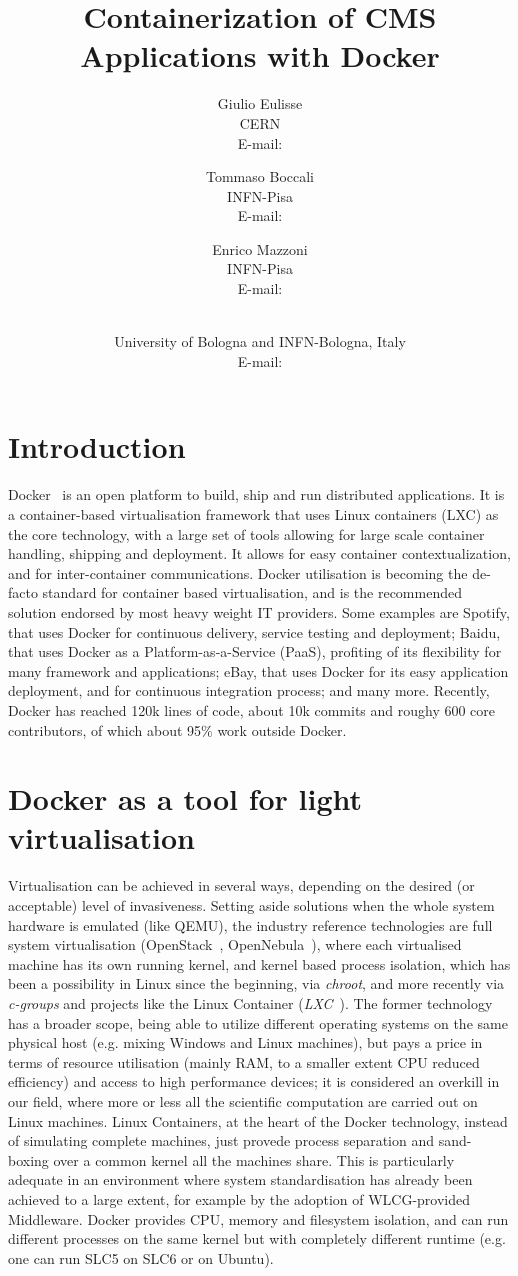 \documentclass{PoS}
\title{Containerization of CMS Applications with Docker}
\author{Giulio Eulisse\\
        CERN\\
        E-mail: \email{Giulio.Eulisse@cern.ch}}
\author{Tommaso Boccali\\
        INFN-Pisa\\
        E-mail: \email{Tommaso.Boccali@pi.infn.it}}
\author{Enrico Mazzoni\\
        INFN-Pisa\\
        E-mail: \email{enrico.mazzoni@pi.infn.it}}
\author{\speaker{Daniele Bonacorsi}\\
        University of Bologna and INFN-Bologna, Italy\\
        E-mail: \email{daniele.bonacorsi@unibo.it}}
\begin{document}
\section{Introduction}

Docker~\cite{docker} is an open platform to build, ship and run distributed applications. It is a container-based virtualisation framework that uses Linux containers (LXC) as the core technology, with a large set of tools allowing for large scale container handling, shipping and deployment. It allows for easy container contextualization, and for inter-container communications. Docker utilisation is becoming the de-facto standard for container based virtualisation, and is the recommended solution endorsed by most heavy weight IT providers. Some examples are Spotify, that uses Docker for continuous delivery, service testing and deployment; Baidu, that uses Docker as a Platform-as-a-Service (PaaS), profiting of its flexibility for many framework and applications; eBay, that uses Docker for its easy application deployment, and for continuous integration process; and many more. Recently, Docker has reached 120k lines of code, about 10k commits and roughy 600 core contributors, of which about 95\% work outside Docker.

\section{Docker as a tool for light virtualisation}

Virtualisation can be achieved in several ways, depending on the desired (or acceptable) level of invasiveness. Setting aside solutions when the whole system hardware is emulated (like QEMU), the industry reference technologies are full system virtualisation (OpenStack~\cite{openstack}, OpenNebula~\cite{opennebula}), where each virtualised machine has its own running kernel, and kernel based process isolation, which has been a possibility in Linux since the beginning, via \emph{chroot}, and more recently via \emph{c-groups} and projects like the Linux Container (\emph{LXC}~\cite{lxc}). The former technology has a broader scope, being able to utilize different operating systems on the same physical host (e.g. mixing Windows and Linux machines), but pays a price in terms of resource utilisation (mainly RAM, to a smaller extent CPU reduced efficiency) and access to high performance devices; it is considered an overkill in our field, where more or less all the scientific computation are carried out on Linux machines. Linux Containers, at the heart of the Docker technology, instead of simulating complete machines, just provede process separation and sand-boxing over a common kernel all the machines share. This is particularly adequate in an environment where system standardisation has already been achieved to a large extent, for example by the adoption of WLCG-provided Middleware.
Docker provides CPU, memory and filesystem isolation, and can run different processes on the same kernel but with completely different runtime (e.g. one can run SLC5 on SLC6 or on Ubuntu).
\end{document}

